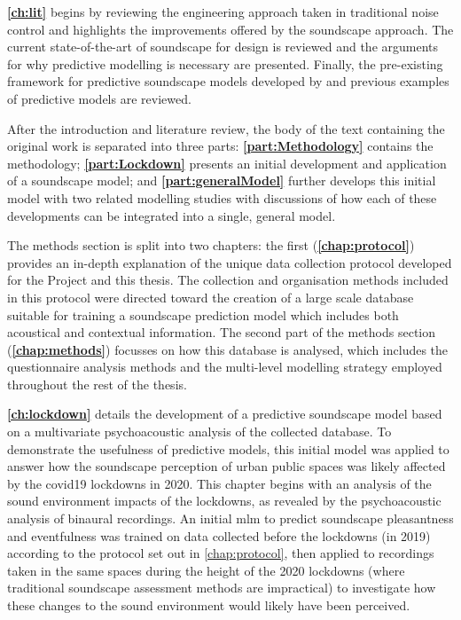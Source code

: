 \textbf{\cref{ch:lit}} begins by reviewing the engineering approach taken in traditional noise control and highlights the improvements offered by the soundscape approach. The current state-of-the-art of soundscape for design is reviewed and the arguments for why predictive modelling is necessary are presented. Finally, the pre-existing framework for predictive soundscape models developed by \citet{Aletta2016Soundscape} and previous examples of predictive models are reviewed. 

After the introduction and literature review, the body of the text containing the original work is separated into three parts: \textbf{\cref{part:Methodology}} contains the methodology; \textbf{\cref{part:Lockdown}} presents an initial development and application of a soundscape model; and \textbf{\cref{part:generalModel}} further develops this initial model with two related modelling studies with discussions of how each of these developments can be integrated into a single, general model. 

The methods section is split into two chapters: the first (\textbf{\cref{chap:protocol}}) provides an in-depth explanation of the unique data collection protocol developed for the  Project and this thesis. The collection and organisation methods included in this protocol were directed toward the creation of a large scale database suitable for training a soundscape prediction model which includes both acoustical and contextual information. The second part of the methods section (\textbf{\cref{chap:methods}}) focusses on how this database is analysed, which includes the questionnaire analysis methods and the multi-level modelling strategy employed throughout the rest of the thesis.

\textbf{\cref{ch:lockdown}} details the development of a predictive soundscape model based on a multivariate psychoacoustic analysis of the collected database. To demonstrate the usefulness of predictive models, this initial model was applied to answer how the soundscape perception of urban public spaces was likely affected by the \gls{covid19} lockdowns in 2020. This chapter begins with an analysis of the sound environment impacts of the lockdowns, as revealed by the psychoacoustic analysis of binaural recordings. An initial \gls{mlm} to predict soundscape pleasantness and eventfulness was trained on data collected before the lockdowns (in 2019) according to the protocol set out in \cref{chap:protocol}, then applied to recordings taken in the same spaces during the height of the 2020 lockdowns (where traditional soundscape assessment methods are impractical) to investigate how these changes to the sound environment would likely have been perceived. 

